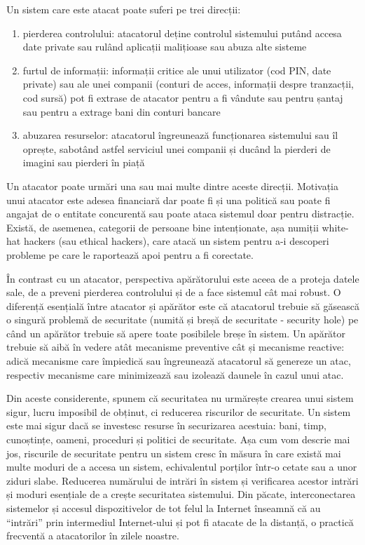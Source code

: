 Un sistem care este atacat poate suferi pe trei direcții:
\begin{enumerate}
  \item pierderea controlului: atacatorul deține controlul sistemului putând accesa date private sau rulând aplicații malițioase sau abuza alte sisteme
  \item furtul de informații: informații critice ale unui utilizator (cod PIN, date private) sau ale unei companii (conturi de acces, informații despre tranzacții, cod sursă) pot fi extrase de atacator pentru a fi vândute sau pentru șantaj sau pentru a extrage bani din conturi bancare
  \item abuzarea resurselor: atacatorul îngreunează funcționarea sistemului sau îl oprește, sabotând astfel serviciul unei companii și ducând la pierderi de imagini sau pierderi în piață
\end{enumerate}

Un atacator poate urmări una sau mai multe dintre aceste direcții. Motivația unui atacator este adesea financiară dar poate fi și una politică sau poate fi angajat de o entitate concurentă sau poate ataca sistemul doar pentru distracție. Există, de asemenea, categorii de persoane bine intenționate, așa numiții white-hat hackers (sau ethical hackers), care atacă un sistem pentru a-i descoperi probleme pe care le raportează apoi pentru a fi corectate.

În contrast cu un atacator, perspectiva apărătorului este aceea de a proteja datele sale, de a preveni pierderea controlului și de a face sistemul cât mai robust. O diferență esențială între atacator și apărător este că atacatorul trebuie să găsească o singură problemă de securitate (numită și breșă de securitate - security hole) pe când un apărător trebuie să apere toate posibilele breșe în sistem. Un apărător trebuie să aibă în vedere atât mecanisme preventive cât și mecanisme reactive: adică mecanisme care împiedică sau îngreunează atacatorul să genereze un atac, respectiv mecanisme care minimizează sau izolează daunele în cazul unui atac.

Din aceste considerente, spunem că securitatea nu urmărește crearea unui sistem sigur, lucru imposibil de obținut, ci reducerea riscurilor de securitate. Un sistem este mai sigur dacă se investesc resurse în securizarea acestuia: bani, timp, cunoștințe, oameni, proceduri și politici de securitate. Așa cum vom descrie mai jos, riscurile de securitate pentru un sistem cresc în măsura în care există mai multe moduri de a accesa un sistem, echivalentul porților într-o cetate sau a unor ziduri slabe. Reducerea numărului de intrări în sistem și verificarea acestor intrări și moduri esențiale de a crește securitatea sistemului. Din păcate, interconectarea sistemelor și accesul dispozitivelor de tot felul la Internet înseamnă că au “intrări” prin intermediul Internet-ului și pot fi atacate de la distanță, o practică frecventă a atacatorilor în zilele noastre.

